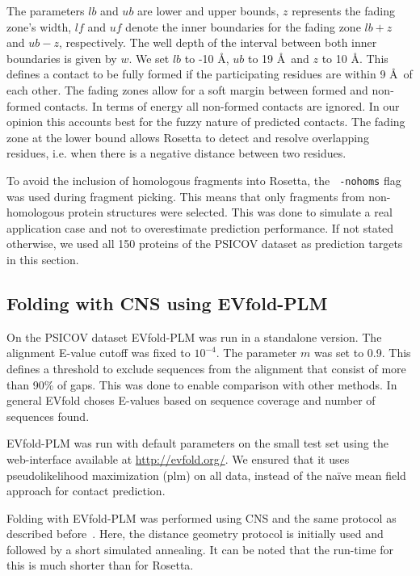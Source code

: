 \documentclass{bioinfo}
\begin{document}
\begin{methods}
The parameters $lb$ and $ub$ are lower and upper bounds, $z$
represents the fading zone's width, $\textit{lf}$ and $\textit{uf}$
denote the inner boundaries for the fading zone $lb + z$ and $ub - z$,
respectively. The well depth of the interval between both inner
boundaries is given by $w$. We set $lb$ to -10 \AA, $ub$ to 19 \AA\
and $z$ to 10 \AA. This defines a contact to be fully formed if the
participating residues are within 9 \AA\ of each other. The fading
zones allow for a soft margin between formed and non-formed
contacts. In terms of energy all non-formed contacts are ignored. In
our opinion this accounts best for the fuzzy nature of predicted
contacts. The fading zone at the lower bound allows Rosetta to detect
and resolve overlapping residues, i.e. when there is a negative
distance between two residues. 


To avoid the inclusion of homologous fragments into Rosetta, the {\tt
  -nohoms} flag was used during fragment
picking. This means that only fragments from non-homologous protein structures were selected. This
was done to simulate a real application case and not to overestimate
prediction performance. If not stated otherwise, we used all 150 proteins of
the PSICOV dataset as prediction targets in this section. 


\subsection{Folding with CNS using EVfold-PLM}
On the PSICOV dataset EVfold-PLM was run in a standalone version. The
alignment E-value cutoff was fixed to $10^{-4}$. The parameter $m$ was
set to 0.9. This defines a threshold to exclude sequences from the
alignment that consist of more than 90\% of gaps. This was done to
enable comparison with other methods. In general EVfold choses
E-values based on sequence coverage and number of sequences found. 

EVfold-PLM was run with default parameters on the small test set using
the web-interface available at \url{http://evfold.org/}. We ensured
that it uses pseudolikelihood maximization (plm) on all data, instead of the na\"ive mean field approach for contact prediction.

Folding with EVfold-PLM was performed using CNS and the same protocol
as described before~\cite[]{marks_protein_2011}. Here, the distance
geometry protocol is initially used and followed by a short simulated
annealing. It can be noted that the run-time for this is much shorter
than for Rosetta. 


\end{methods}
\end{document}
